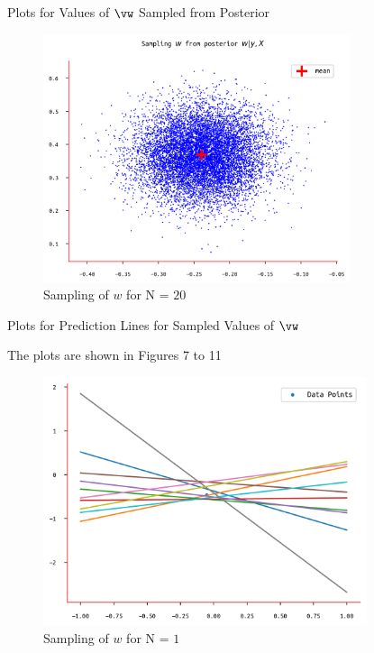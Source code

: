 \documentclass{article}
\begin{document}
\begin{question}
\begin{qsection}{Plots for Values of $\vw$ Sampled from Posterior}
		\begin{figure}[h!]
			\centering
			\includegraphics[height=275px]{includes/plots/q4b/posterior-samples-5.png}
			\caption{Sampling of $w$ for N = $20$}
		\end{figure}

	\end{qsection}

	\begin{qsection}{Plots for Prediction Lines for Sampled Values of $\vw$}

		The plots are shown in Figures 7 to 11

		\begin{figure}[h!]
			\centering
			\includegraphics[height=275px]{includes/plots/q4c/predictive-models-1.png}
			\caption{Sampling of $w$ for N = $1$}
		\end{figure}


\end{qsection}
\end{question}
\end{document}
